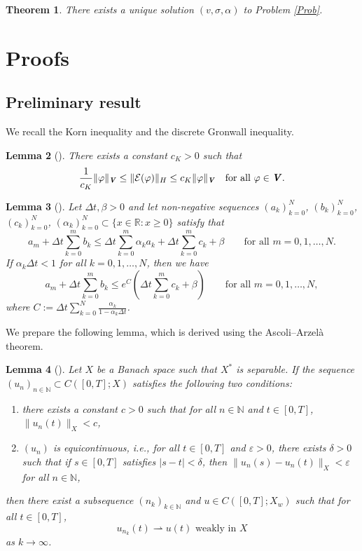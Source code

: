 \documentclass[11pt, a4paper]{article}
\newtheorem{Th}{Theorem}[section]
\newtheorem{Lem}[Th]{Lemma}
\newcommand{\R}{{\mathbb R}}
\newcommand{\N}{{\mathbb N}}
\newcommand{\dt}{{\Delta t}}
\newcommand{\E}{{\mathcal{E}}}
\newcommand{\bm}[1]{\textbf{\textit{#1}}}%
\newcommand{\Vv}{{\bm{V}}}
\newcommand{\Hs}{{H}}
\newcommand{\eps}{\varepsilon}
\begin{document}
\begin{Th}\label{Th:exist}
    There exists a unique solution $(v,\sigma,\alpha)$ to Problem \ref{Prob}.
\end{Th}

\section{Proofs}

\subsection{Preliminary result}

We recall the Korn inequality and the discrete Gronwall inequality.

\begin{Lem}[{\cite[Lemma 5.4.18]{Trangenstein13}}]\label{Lem:Korn}
    There exists a constant $c_K>0$ such that 
    \[
        \frac{1}{c_K}\|\varphi\|_\Vv \le \|\E(\varphi)\|_\Hs 
        \le c_K\|\varphi\|_\Vv \quad\mbox{for all }\varphi\in \Vv.
    \]
\end{Lem}

\begin{Lem}[{\cite[Lemma 5.1]{HR90}}]\label{lem:gronwall}
  Let $\dt,\beta>0$ and let non-negative sequences 
  $(a_k)^N_{k=0}$, $(b_k)^N_{k=0}$, $(c_k)^N_{k=0}$, 
  $(\alpha_k)^N_{k=0} \subset \{x\in\R : x \ge 0\}$ satisfy that
  \[
      a_m+\dt\sum^m_{k=0}b_k
      \le \dt\sum^m_{k=0}\alpha_k a_k+\dt\sum^m_{k=0}c_k+\beta
      \qquad\mbox{for all }m=0,1,\ldots,N.
  \]
  If $\alpha_k\dt<1$ for all $k=0,1,\ldots,N$, then we have
  \[
      a_m+\dt\sum^m_{k=0}b_k
      \le e^C\left(\dt\sum^m_{k=0}c_k+\beta\right)
      \qquad\mbox{for all }m=0,1,\ldots,N,
  \]
  where $C:=\dt\sum^N_{k=0}\frac{\alpha_k}{1-\alpha_k\dt}$.
\end{Lem}

We prepare the following lemma, which is derived using the Ascoli--Arzel{\`{a}} theorem.

\begin{Lem}[{\cite[Lemma 5.3]{AM25}}]\label{Lem:AA}
    Let $X$ be a Banach space such that $X^*$ is separable. If the sequence $(u_n)_{n\in\N}\subset C([0,T];X)$ satisfies the following two conditions:
    \begin{enumerate}
        \item[(i)] there exists a constant $c>0$ such that for all $n\in\N$ and $t\in[0,T]$, $\|u_n(t)\|_X < c$,
        \item[(ii)] $(u_n)$ is equicontinuous, i.e., for all $t\in[0,T]$ and $\eps>0$, there exists $\delta>0$ such that if $s\in[0,T]$ satisfies $|s-t|<\delta$, then $\|u_n(s) - u_n(t)\|_X < \eps$ for all $n\in\N$,
    \end{enumerate}
    then there exist a subsequence $(n_k)_{k\in\N}$ and $u\in C([0,T];X_w)$ such that for all $t\in[0,T]$,
    \[
        u_{n_k}(t) \rightharpoonup u(t) \mbox{ weakly in } X
    \]
    as $k\rightarrow\infty$.
\end{Lem}
\end{document}
